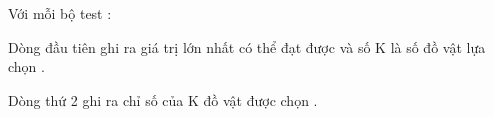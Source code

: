 Với mỗi bộ test :


Dòng đầu tiên ghi ra giá trị lớn nhất có thể đạt được và số K là số đồ vật lựa chọn .


Dòng thứ 2 ghi ra chỉ số của K đồ vật được chọn .